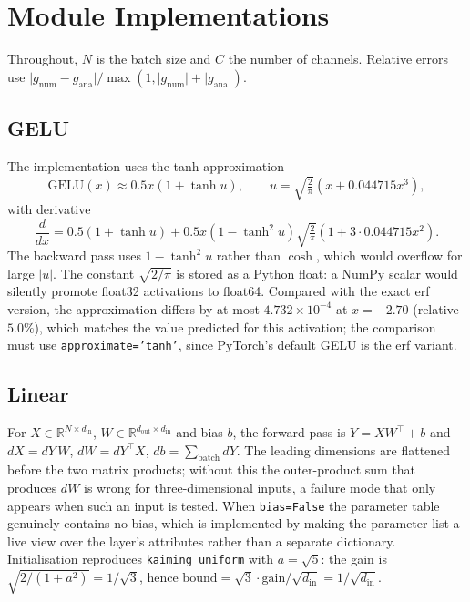 \section{Module Implementations}
\label{sec:partb-modules}

Throughout, $N$ is the batch size and $C$ the number of channels. Relative errors use
$\lvert g_{\text{num}}-g_{\text{ana}}\rvert/\max(1,\lvert g_{\text{num}}\rvert+\lvert g_{\text{ana}}\rvert)$.

\subsection{GELU}

The implementation uses the tanh approximation
\begin{equation}
\mathrm{GELU}(x) \approx 0.5x\left(1+\tanh u\right), \qquad
u = \sqrt{\tfrac{2}{\pi}}\left(x + 0.044715x^3\right),
\end{equation}
with derivative
\begin{equation}
\frac{d}{dx} = 0.5(1+\tanh u) + 0.5x\left(1-\tanh^2 u\right)\sqrt{\tfrac{2}{\pi}}\left(1+3\cdot0.044715x^2\right).
\end{equation}
The backward pass uses $1-\tanh^2 u$ rather than $\cosh$, which would overflow for large $\lvert u\rvert$.
The constant $\sqrt{2/\pi}$ is stored as a Python float: a NumPy scalar would silently promote
float32 activations to float64. Compared with the exact erf version, the approximation differs by at
most $4.732\times10^{-4}$ at $x=-2.70$ (relative $5.0\%$), which matches the value predicted for this
activation; the comparison must use \texttt{approximate='tanh'}, since PyTorch's default GELU is the
erf variant.

\subsection{Linear}

For $X\in\mathbb{R}^{N\times d_{\text{in}}}$, $W\in\mathbb{R}^{d_{\text{out}}\times d_{\text{in}}}$
and bias $b$, the forward pass is $Y=XW^{\top}+b$ and
$dX=dY\,W$, $dW=dY^{\top}X$, $db=\sum_{\text{batch}}dY$. The leading dimensions are flattened before
the two matrix products; without this the outer-product sum that produces $dW$ is wrong for
three-dimensional inputs, a failure mode that only appears when such an input is tested. When
\texttt{bias=False} the parameter table genuinely contains no bias, which is implemented by making
the parameter list a live view over the layer's attributes rather than a separate dictionary.
Initialisation reproduces \texttt{kaiming\_uniform} with $a=\sqrt5$: the gain is
$\sqrt{2/(1+a^2)}=1/\sqrt3$, hence $\mathrm{bound}=\sqrt3\cdot\mathrm{gain}/\sqrt{d_{\text{in}}}=1/\sqrt{d_{\text{in}}}$.

